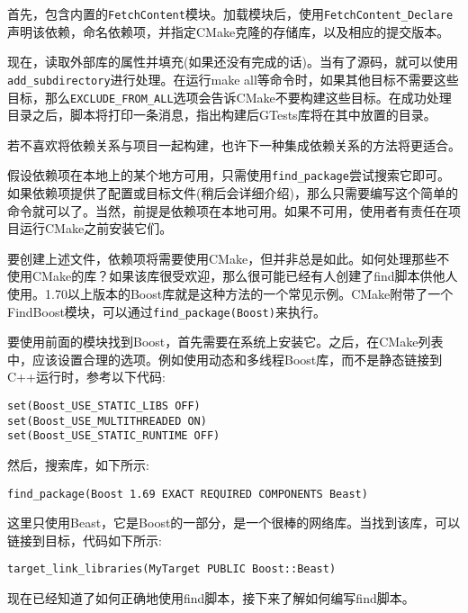 首先，包含内置的\texttt{FetchContent}模块。加载模块后，使用\texttt{FetchContent\_Declare}声明该依赖，命名依赖项，并指定CMake克隆的存储库，以及相应的提交版本。

现在，读取外部库的属性并填充(如果还没有完成的话)。当有了源码，就可以使用\texttt{add\_subdirectory}进行处理。在运行make all等命令时，如果其他目标不需要这些目标，那么\texttt{EXCLUDE\_FROM\_ALL}选项会告诉CMake不要构建这些目标。在成功处理目录之后，脚本将打印一条消息，指出构建后GTests库将在其中放置的目录。

若不喜欢将依赖关系与项目一起构建，也许下一种集成依赖关系的方法将更适合。


假设依赖项在本地上的某个地方可用，只需使用\texttt{find\_package}尝试搜索它即可。如果依赖项提供了配置或目标文件(稍后会详细介绍)，那么只需要编写这个简单的命令就可以了。当然，前提是依赖项在本地可用。如果不可用，使用者有责任在项目运行CMake之前安装它们。

要创建上述文件，依赖项将需要使用CMake，但并非总是如此。如何处理那些不使用CMake的库？如果该库很受欢迎，那么很可能已经有人创建了find脚本供他人使用。1.70以上版本的Boost库就是这种方法的一个常见示例。CMake附带了一个FindBoost模块，可以通过\texttt{find\_package(Boost)}来执行。

要使用前面的模块找到Boost，首先需要在系统上安装它。之后，在CMake列表中，应该设置合理的选项。例如使用动态和多线程Boost库，而不是静态链接到C++运行时，参考以下代码:

\begin{lstlisting}[style=styleCMake]
set(Boost_USE_STATIC_LIBS OFF)
set(Boost_USE_MULTITHREADED ON)
set(Boost_USE_STATIC_RUNTIME OFF)
\end{lstlisting}

然后，搜索库，如下所示:

\begin{lstlisting}[style=styleCMake]
find_package(Boost 1.69 EXACT REQUIRED COMPONENTS Beast)
\end{lstlisting}

这里只使用Beast，它是Boost的一部分，是一个很棒的网络库。当找到该库，可以链接到目标，代码如下所示:

\begin{lstlisting}[style=styleCMake]
target_link_libraries(MyTarget PUBLIC Boost::Beast)
\end{lstlisting}

现在已经知道了如何正确地使用find脚本，接下来了解如何编写find脚本。

